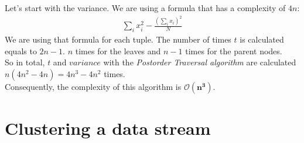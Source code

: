 \documentclass[11pt,a4paper,english]{article}
\begin{document}
        Let's start with the variance. We are using a formula that has a complexity of $4n$:
        \begin{align*}
          \sum_i x_i^2 - \frac{(\sum_i x_i)^2}{N}
        \end{align*}
        We are using that formula for each tuple. The number of times $t$ is calculated equals to $2n-1$. $n$ times for the leaves and $n-1$ times for the parent nodes. \\
        So in total, $t$ and $variance$ with the \textit{Postorder Traversal algorithm} are calculated $n(4n^2-4n) = 4n^3-4n^2$ times.\\
        Consequently, the complexity of this algorithm is $\mathbf{\mathcal{O}(n^3)}$.

    \section{Clustering a data stream}
\end{document}
